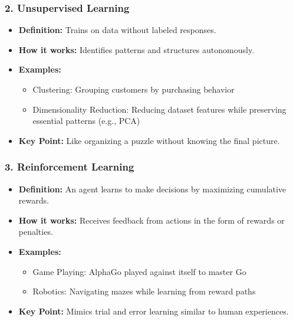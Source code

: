 \documentclass[aspectratio=169]{beamer}
\begin{document}
\begin{frame}[fragile]
    \frametitle{2. Unsupervised Learning}
    \begin{itemize}
        \item \textbf{Definition:} Trains on data without labeled responses.
        \item \textbf{How it works:} Identifies patterns and structures autonomously.
        \item \textbf{Examples:}
        \begin{itemize}
            \item Clustering: Grouping customers by purchasing behavior
            \item Dimensionality Reduction: Reducing dataset features while preserving essential patterns (e.g., PCA)
        \end{itemize}
        \item \textbf{Key Point:} Like organizing a puzzle without knowing the final picture.
    \end{itemize}
\end{frame}

\begin{frame}[fragile]
    \frametitle{3. Reinforcement Learning}
    \begin{itemize}
        \item \textbf{Definition:} An agent learns to make decisions by maximizing cumulative rewards.
        \item \textbf{How it works:} Receives feedback from actions in the form of rewards or penalties.
        \item \textbf{Examples:}
        \begin{itemize}
            \item Game Playing: AlphaGo played against itself to master Go
            \item Robotics: Navigating mazes while learning from reward paths
        \end{itemize}
        \item \textbf{Key Point:} Mimics trial and error learning similar to human experiences.
    \end{itemize}
\end{frame}
\end{document}
